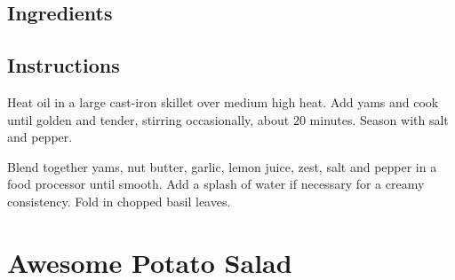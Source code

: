 \documentclass[ansiapaper,10pt,english]{sphinxmanual}
\begin{document}
\section{Ingredients}
\label{\detokenize{roasted_yam_dip:ingredients}}
%
\begin{sphinxVerbatim}[commandchars=\\\{\}]
  

     

    

      

   

   

   

    
\end{sphinxVerbatim}


\section{Instructions}
\label{\detokenize{roasted_yam_dip:instructions}}
Heat oil in a large cast-iron skillet over medium high heat. Add yams and cook until golden and tender, stirring occasionally, about 20 minutes.  Season with salt and pepper.

Blend together yams, nut butter, garlic, lemon juice, zest, salt and pepper in a food processor until smooth. Add a splash of water if necessary for a creamy consistency.  Fold in chopped basil leaves.


\chapter{Awesome Potato Salad}
\label{\detokenize{Potato_Sal:awesome-potato-salad}}\label{\detokenize{Potato_Sal::doc}}
\end{document}

